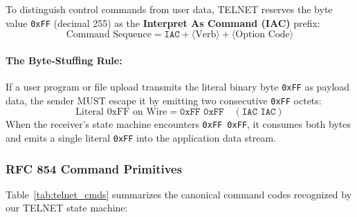 \documentclass[12pt, a4paper]{article}
\begin{document}
To distinguish control commands from user data, TELNET reserves the byte value \texttt{0xFF} (decimal 255) as the \textbf{Interpret As Command (IAC)} prefix:
\begin{equation}
    \text{Command Sequence} = \texttt{IAC} + \langle\text{Verb}\rangle + \langle\text{Option Code}\rangle
\end{equation}

\paragraph{The Byte-Stuffing Rule:}
If a user program or file upload transmits the literal binary byte \texttt{0xFF} as payload data, the sender MUST escape it by emitting two consecutive \texttt{0xFF} octets:
\begin{equation}
    \text{Literal 0xFF on Wire} = \texttt{0xFF 0xFF} \quad (\texttt{IAC IAC})
\end{equation}
When the receiver's state machine encounters \texttt{0xFF 0xFF}, it consumes both bytes and emits a single literal \texttt{0xFF} into the application data stream.

\subsubsection{RFC 854 Command Primitives}
Table~\ref{tab:telnet_cmds} summarizes the canonical command codes recognized by our TELNET state machine:
\end{document}
